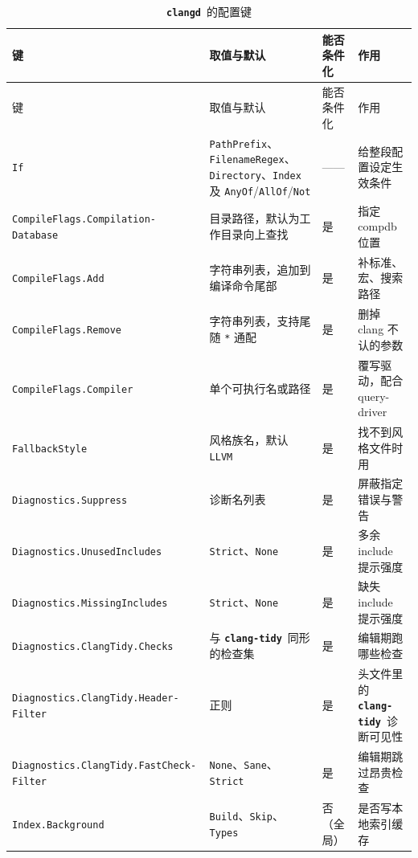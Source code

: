 \documentclass[12pt,a4paper,fontset=fandol]{ctexbook}
\newcommand{\Bk}{\discretionary{}{}{}}
\newcommand{\Lib}[1]{\textbf{\texttt{#1}}}
\newcommand{\Tidy}{\Lib{clang-tidy}}
\newcommand{\CD}{\Lib{clangd}}
\begin{document}
{\footnotesize
\begin{longtable}{@{}>{\raggedright\arraybackslash}p{}
                  >{\raggedright\arraybackslash}p{}
                  >{\raggedright\arraybackslash}p{}
                  >{\raggedright\arraybackslash}p{}@{}}
\caption{\CD\ 的配置键}\label{tab:appA-clangd}\\
\toprule
键 & 取值与默认 & 能否条件化 & 作用 \\
\midrule
\endfirsthead
\toprule
键 & 取值与默认 & 能否条件化 & 作用 \\
\midrule
\endhead
\bottomrule
\endlastfoot
\texttt{If} & \texttt{PathPrefix}、\texttt{FilenameRegex}、\texttt{Directory}、\texttt{Index} 及 \texttt{AnyOf}/{\Bk}\texttt{AllOf}/{\Bk}\texttt{Not} & —— & 给整段配置设定生效条件 \\
\texttt{CompileFlags.\allowbreak Compilation-\allowbreak Database} & 目录路径，默认为工作目录向上查找 & 是 & 指定 compdb 位置 \\
\texttt{CompileFlags.Add} & 字符串列表，追加到编译命令尾部 & 是 & 补标准、宏、搜索路径 \\
\texttt{CompileFlags.Remove} & 字符串列表，支持尾随 \texttt{*} 通配 & 是 & 删掉 clang 不认的参数 \\
\texttt{CompileFlags.Compiler} & 单个可执行名或路径 & 是 & 覆写驱动，配合 query-driver \\
\texttt{FallbackStyle} & 风格族名，默认 \texttt{LLVM} & 是 & 找不到风格文件时用 \\
\texttt{Diagnostics.\allowbreak Suppress} & 诊断名列表 & 是 & 屏蔽指定错误与警告 \\
\texttt{Diagnostics.\allowbreak UnusedIncludes} & \texttt{Strict}、\texttt{None} & 是 & 多余 include 提示强度 \\
\texttt{Diagnostics.\allowbreak MissingIncludes} & \texttt{Strict}、\texttt{None} & 是 & 缺失 include 提示强度 \\
\texttt{Diagnostics.\allowbreak ClangTidy.Checks} & 与 \Tidy\ 同形的检查集 & 是 & 编辑期跑哪些检查 \\
\texttt{Diagnostics.\allowbreak ClangTidy.Header-\allowbreak Filter} & 正则 & 是 & 头文件里的 \Tidy\ 诊断可见性 \\
\texttt{Diagnostics.\allowbreak ClangTidy.FastCheck-\allowbreak Filter} & \texttt{None}、\texttt{Sane}、\texttt{Strict} & 是 & 编辑期跳过昂贵检查 \\
\texttt{Index.Background} & \texttt{Build}、\texttt{Skip}、\texttt{Types} & 否（全局） & 是否写本地索引缓存 \\

\end{longtable}}
\end{document}
